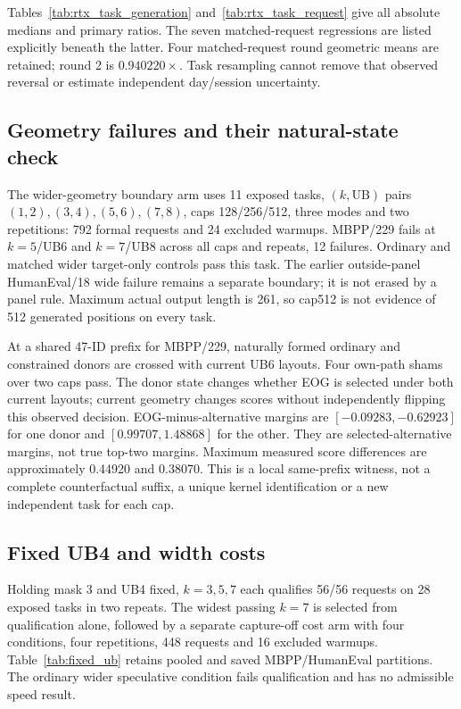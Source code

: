 Tables~\ref{tab:rtx_task_generation} and~\ref{tab:rtx_task_request} give all absolute medians and primary ratios. The seven matched-request regressions are listed explicitly beneath the latter. Four matched-request round geometric means are retained; round 2 is $0.940220\times$. Task resampling cannot remove that observed reversal or estimate independent day/session uncertainty.




\subsection{Geometry failures and their natural-state check}
\label{supp:geometry_boundary}
The wider-geometry boundary arm uses 11 exposed tasks, $(k,\mathrm{UB})$ pairs $(1,2),(3,4),(5,6),(7,8)$, caps 128/256/512, three modes and two repetitions: 792 formal requests and 24 excluded warmups. MBPP/229 fails at $k=5$/UB6 and $k=7$/UB8 across all caps and repeats, 12 failures. Ordinary and matched wider target-only controls pass this task. The earlier outside-panel HumanEval/18 wide failure remains a separate boundary; it is not erased by a panel rule. Maximum actual output length is 261, so cap512 is not evidence of 512 generated positions on every task.

At a shared 47-ID prefix for MBPP/229, naturally formed ordinary and constrained donors are crossed with current UB6 layouts. Four own-path shams over two caps pass. The donor state changes whether EOG is selected under both current layouts; current geometry changes scores without independently flipping this observed decision. EOG-minus-alternative margins are $[-0.09283,-0.62923]$ for one donor and $[0.99707,1.48868]$ for the other. They are selected-alternative margins, not true top-two margins. Maximum measured score differences are approximately 0.44920 and 0.38070. This is a local same-prefix witness, not a complete counterfactual suffix, a unique kernel identification or a new independent task for each cap.

\subsection{Fixed UB4 and width costs}
\label{supp:fixed_ub_width}
Holding mask 3 and UB4 fixed, $k=3,5,7$ each qualifies 56/56 requests on 28 exposed tasks in two repeats. The widest passing $k=7$ is selected from qualification alone, followed by a separate capture-off cost arm with four conditions, four repetitions, 448 requests and 16 excluded warmups. Table~\ref{tab:fixed_ub} retains pooled and saved MBPP/HumanEval partitions. The ordinary wider speculative condition fails qualification and has no admissible speed result.

